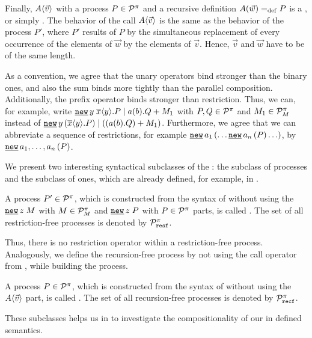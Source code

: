 Finally, $A\langle\vec{v}\rangle$ with a process $P\in\mathcal P^{\pi}$ and a recursive definition $A(\vec{w})=_{\mathrm{def}}{}P$ is a , or simply . The behavior of the call $A\langle\vec{v}\rangle$ is the same as the behavior of the process $P'$, where $P'$ results of $P$ by the simultaneous replacement of every occurrence of the elements of $\vec{w}$ by the elements of $\vec{v}$. Hence, $\vec{v}$ and $\vec{w}$ have to be of the same length.

As a convention, we agree that the unary operators bind stronger than the binary ones, and also the sum binds more tightly than the parallel composition. Additionally, the prefix operator binds stronger than restriction. Thus, we can, for example, write $\procpar{\procres{y}{\out{x}{y}.P}}{\procchoice{\inp{a}{b}.Q}{M_1}}$ with $P,Q\in\mathcal P^{\pi}$ and $M_1\in\mathcal P^{\pi}_{M}$ instead of $\procpar{\procres[a]{y}{\out{x}{y}.P}}{\left(\procchoice{\left(\inp{a}{b}.Q\right)}{M_1}\right)}$. Furthermore, we agree that we can abbreviate a sequence of restrictions, for example $\procres[()]{a_1}{\ldots \procres[()]{a_n}{P}\ldots}$, by $\procres[()]{a_1,\ldots,a_n}{P}$.

We present two interesting syntactical subclasses of the \picalc{}: the subclass of  processes and the subclass of  ones, which are already defined, for example, in \cite{meyer}.

\begin{definition}
\label{def_res_free}
A process $P'\in\mathcal P^{\pi}$, which is constructed from the syntax of  without using the $\procres{z}{M}$ with $M\in\mathcal P^{\pi}_{M}$ and $\procres{z}{P}$ with $P\in\mathcal P^{\pi}$ parts, is called . The set of all restriction-free processes is denoted by $\mathcal P^{\pi}_{\mathtt{resf}}$.
\end{definition}

Thus, there is no restriction operator within a restriction-free process. Analogously, we define the recursion-free process by not using the call operator from , while building the process.

\begin{definition}
\label{def_res_free}
A process $P\in\mathcal P^{\pi}$, which is constructed from the syntax of  without using the $A\langle\vec{v}\rangle$ part, is called . The set of all recursion-free processes is denoted by $\mathcal P^{\pi}_{\mathtt{recf}}$.
\end{definition}

These subclasses helps us in  to investigate the compositionality of our in  defined semantics.
